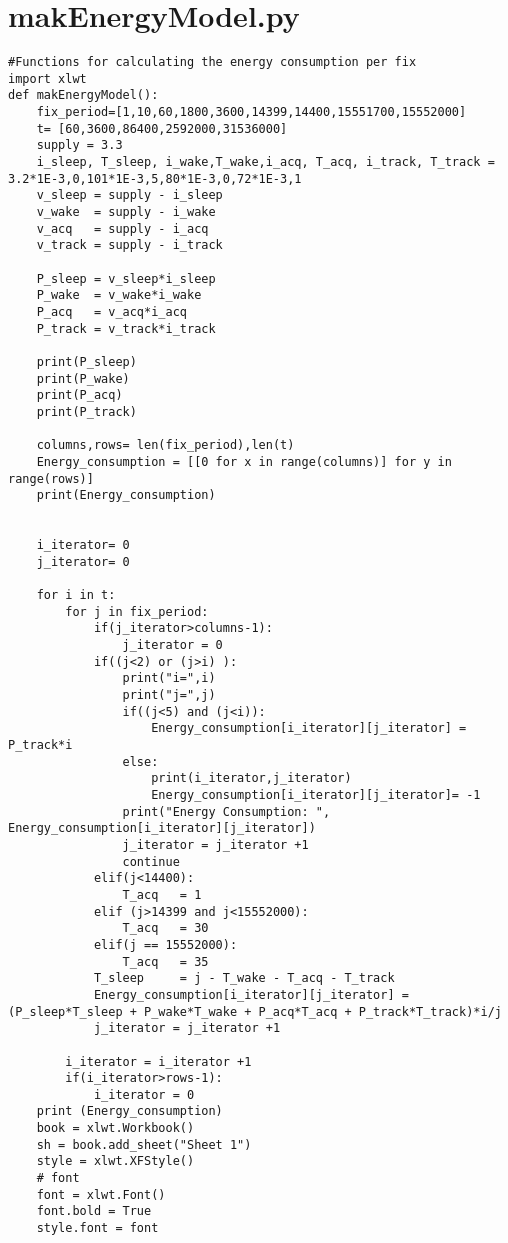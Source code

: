 \begin{appendices}
\begin{lstlisting}
\end{lstlisting}
\label{Appendix:L76GNSS.py}
\chapter{makEnergyModel.py}
\begin{lstlisting}
#Functions for calculating the energy consumption per fix
import xlwt
def makEnergyModel():
    fix_period=[1,10,60,1800,3600,14399,14400,15551700,15552000]
    t= [60,3600,86400,2592000,31536000]
    supply = 3.3
    i_sleep, T_sleep, i_wake,T_wake,i_acq, T_acq, i_track, T_track = 3.2*1E-3,0,101*1E-3,5,80*1E-3,0,72*1E-3,1
    v_sleep = supply - i_sleep
    v_wake  = supply - i_wake
    v_acq   = supply - i_acq
    v_track = supply - i_track

    P_sleep = v_sleep*i_sleep
    P_wake  = v_wake*i_wake
    P_acq   = v_acq*i_acq
    P_track = v_track*i_track
    
    print(P_sleep)
    print(P_wake)
    print(P_acq)
    print(P_track)

    columns,rows= len(fix_period),len(t)
    Energy_consumption = [[0 for x in range(columns)] for y in range(rows)]
    print(Energy_consumption)


    i_iterator= 0
    j_iterator= 0

    for i in t:
        for j in fix_period:
            if(j_iterator>columns-1):
                j_iterator = 0   
            if((j<2) or (j>i) ):
                print("i=",i)
                print("j=",j)
                if((j<5) and (j<i)):
                    Energy_consumption[i_iterator][j_iterator] = P_track*i
                else:
                    print(i_iterator,j_iterator)
                    Energy_consumption[i_iterator][j_iterator]= -1
                print("Energy Consumption: ", Energy_consumption[i_iterator][j_iterator])
                j_iterator = j_iterator +1
                continue
            elif(j<14400):
                T_acq   = 1
            elif (j>14399 and j<15552000):
                T_acq   = 30      
            elif(j == 15552000):
                T_acq   = 35
            T_sleep     = j - T_wake - T_acq - T_track 
            Energy_consumption[i_iterator][j_iterator] = (P_sleep*T_sleep + P_wake*T_wake + P_acq*T_acq + P_track*T_track)*i/j
            j_iterator = j_iterator +1

        i_iterator = i_iterator +1
        if(i_iterator>rows-1):
            i_iterator = 0  
    print (Energy_consumption)
    book = xlwt.Workbook()
    sh = book.add_sheet("Sheet 1")
    style = xlwt.XFStyle()
    # font
    font = xlwt.Font()
    font.bold = True
    style.font = font
    

\end{lstlisting}
\end{appendices}
